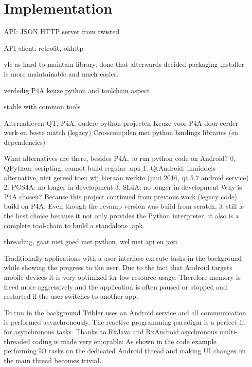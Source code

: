 \chapter{Implementation}

API: JSON HTTP server from twisted

API client: retrofit, okhttp


vlc as hard to maintain library, done that
afterwards decided packaging installer is more maintainable and much easier.




verdedig P4A keuze
python and toolchain aspect

stable with common tools

Alternatieven QT, P4A, oudere python projecten
Keuze voor P4A door eerder werk en beste match (legacy)
Crosscompilen met python bindings libraries (en dependencies)

What alternatives are there, besides P4A, to run python code on Android?
0. QPython: scripting, cannot build regular .apk
1. QtAndroid, inmiddels alternative, niet gereed toen wij hieraan werkte (juni 2016, qt 5.7 android service)
2. PGS4A: no longer in development
3. SL4A: no longer in development
Why is P4A chosen?
Because this project continued from previous work (legacy code) build on P4A.
Even though the revamp version was build from scratch, it still is the best choice because it not only provides the Python interpreter, it also is a complete tool-chain to build a standalone .apk.


threading, gaat niet goed met python, wel met api en java



Traditionally applications with a user interface execute tasks in the background while showing the progress to the user.
Due to the fact that Android targets mobile devices it is very optimized for low resource usage.
Therefore memory is freed more aggressively and the application is often paused or stopped and restarted if the user switches to another app.

To run in the background Tribler uses an Android service and all communication is performed asynchronously.
The reactive programming paradigm is a perfect fit for asynchronous tasks.
Thanks to RxJava and RxAndroid asychronous multi-threaded coding is made very enjoyable:
As shown in the code example performing IO tasks on the dedicated Android thread and making UI changes on the main thread becomes trivial.

